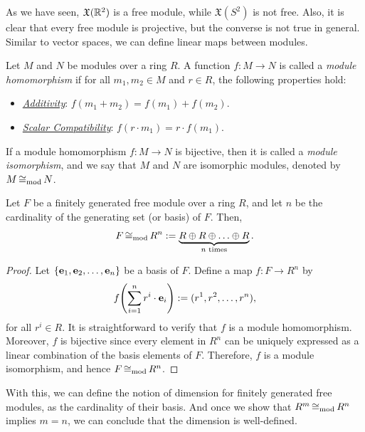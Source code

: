 As we have seen, \(\mathfrak{X}(\mathbb R^2)\) is a free module, while \(\mathfrak{X}(S^2)\) is not free. Also, it is clear that every free module is projective, but the converse is not true in general. Similar to vector spaces, we can define linear maps between modules.
\begin{definition}
	Let \(M\) and \(N\) be modules over a ring \(R\). A function \(f: M \to N\) is called a \emph{module homomorphism} if for all \(m_1, m_2 \in M\) and \(r \in R\), the following properties hold:
	\begin{itemize}
		\item \uline{\emph{Additivity}}: \(f(m_1 + m_2) = f(m_1) + f(m_2)\).
		\item \uline{\emph{Scalar Compatibility}}: \(f(r \cdot m_1) = r \cdot f(m_1)\).
	\end{itemize}
	If a module homomorphism \(f: M \to N\) is bijective, then it is called a \emph{module isomorphism}, and we say that \(M\) and \(N\) are isomorphic modules, denoted by \(M \operatorname{\mathrel{\cong_{\text{mod}}}} N\).
\end{definition}
\begin{proposition}
	Let \(F\) be a finitely generated free module over a ring \(R\), and let \(n\) be the cardinality of the generating set (or basis) of \(F\). Then,
	\begin{equation*}
		F \operatorname{\mathrel{\cong_{\text{mod}}}} R^n := \underbrace{R \oplus R \oplus \ldots \oplus R}_{n \text{ times}}.
	\end{equation*}
\end{proposition}
\begin{proof}
	Let \(\{\vb{e}_1, \vb{e}_2, \ldots, \vb{e}_n\}\) be a basis of \(F\). Define a map \(f: F \to R^n\) by
	\begin{equation*}
		f\qty(\sum_{i=1}^n r^i \cdot \vb{e}_i) := (r^1, r^2, \ldots, r^n),
	\end{equation*}
	for all \(r^i \in R\). It is straightforward to verify that \(f\) is a module homomorphism. Moreover, \(f\) is bijective since every element in \(R^n\) can be uniquely expressed as a linear combination of the basis elements of \(F\). Therefore, \(f\) is a module isomorphism, and hence \(F \operatorname{\mathrel{\cong_{\text{mod}}}} R^n\).
\end{proof}
With this, we can define the notion of dimension for finitely generated free modules, as the cardinality of their basis. And once we show that \(R^m \operatorname{\mathrel{\cong_{\text{mod}}}} R^n\) implies \(m = n\), we can conclude that the dimension is well-defined.

